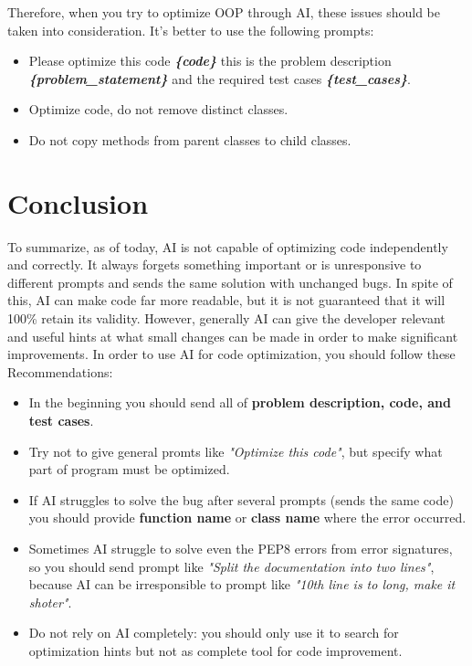 \documentclass[12pt]{report}
\begin{document}
			Therefore, when you try to optimize OOP through AI, these issues should be taken
			into consideration. It’s better to use the following prompts:

			\begin{itemize}
				\item Please optimize this code \textbf{\textit{\{code\}}} this is the problem description
				\textbf{\textit{\{problem\_statement\}}} and the required test cases \textbf{\textit{\{test\_cases\}}}.
				\item Optimize code, do not remove distinct classes.
				\item Do not copy methods from parent classes to child classes.
	\end{itemize}

	\section{Conclusion}
		To summarize, as of today, AI is not capable of optimizing code independently and correctly. It always forgets something important or is unresponsive to
		different prompts and sends the same solution with unchanged bugs. In spite of
		this, AI can make code far more readable, but it is not guaranteed that it
		will 100\% retain its validity. However, generally AI can give the developer relevant and useful hints at what small changes can be made in order to make significant improvements.
		In order to use AI for code optimization, you should follow these
		Recommendations:


		\begin{itemize}
			\item In the beginning you should send all of \textbf{problem description, code, and test cases}.
			\item Try not to give general promts like \textit{"Optimize this code"}, but specify what part of program
			must be optimized.
			\item If AI struggles to solve the bug after several prompts (sends the same code) you should provide \textbf{function name} or \textbf{class name} where the error occurred.
			\item Sometimes AI struggle to solve even the PEP8 errors from error signatures, so you should send prompt like \textit{"Split the documentation into two lines"}, because AI can be irresponsible to prompt like \textit{"10th line is to long, make it shoter"}.
			\item Do not rely on AI completely: you should only use it to search for optimization hints but not as complete tool for code improvement.
		\end{itemize}
\end{document}
